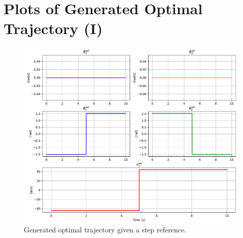 \newpage
\section{Plots of Generated Optimal Trajectory (I)}

\begin{figure}[htb]
    \centering
    \includegraphics[width=1\linewidth]{img/1-Task1/Reference.pdf}
    \caption{Generated optimal trajectory given a step reference.}
    \label{fig:optimal-step}
\end{figure}

